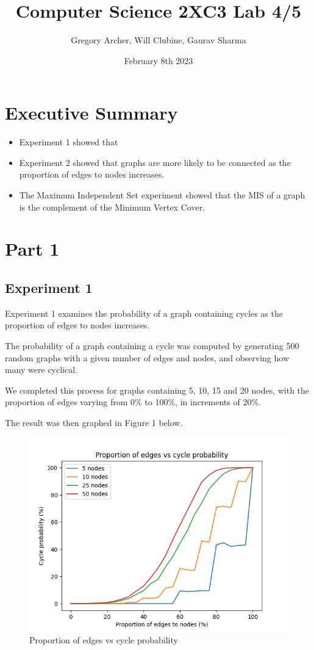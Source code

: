 \documentclass[titlepage]{article}
\title{Computer Science 2XC3 Lab 4/5}
\author{Gregory Archer, Will Clubine, Gaurav Sharma}
\date{February 8th 2023}
\begin{document}
\maketitle
\tableofcontents
\listoffigures

\newpage

\section{Executive Summary}
\begin{itemize}
    \item Experiment 1 showed that
    \item Experiment 2 showed that graphs are more likely to be connected as the proportion of edges to nodes increases.
    \item The Maximum Independent Set experiment showed that the MIS of a graph is the complement of the Minimum Vertex Cover.
\end{itemize}

\section{Part 1}

\subsection{Experiment 1}

Experiment 1 examines the probability of a graph containing cycles as the proportion of edges to nodes increases.

The probability of a graph containing a cycle was computed by generating 500 random graphs with a given number of edges and nodes, and observing how many were cyclical.

We completed this process for graphs containing 5, 10, 15 and 20 nodes, with the proportion of edges varying from 0\% to 100\%, in increments of 20\%.

The result was then graphed in Figure 1 below.

\begin{figure}[H]
    \centering
    \includegraphics[width=0.8\linewidth]{experiment_1.png}
    \caption{Proportion of edges vs cycle probability}
    \label{fig:edges_vs_cycle}
\end{figure}
\end{document}
